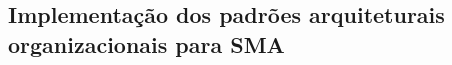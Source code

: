 \let\cleardoublepage\clearpage
\begin{apendicesenv}
\let\cleardoublepage\clearpage



\chapter{Implementação dos padrões arquiteturais organizacionais para SMA}\label{appendix:implementacao_catalogo}







\end{apendicesenv}
